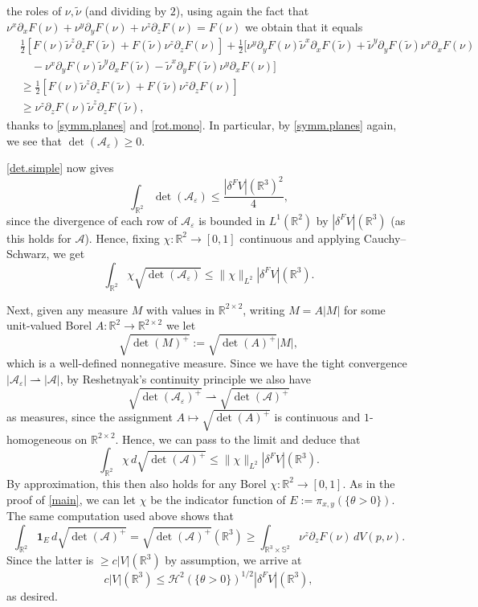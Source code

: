 \documentclass[11pt,a4paper]{amsart}
\newcommand{\R}{\mathbb{R}}
\newcommand{\de}{\partial}
\newcommand{\uno}{\bm{1}}
\theoremstyle{definition}
\renewcommand{\epsilon}{\varepsilon}
\newcommand{\weakto}{\rightharpoonup}
\begin{document}
the roles of $\nu,\tilde\nu$ (and dividing by $2$), using again the fact that $\nu^x\de_xF(\nu)+\nu^y\de_yF(\nu)+\nu^z\de_zF(\nu)=F(\nu)$ we obtain that it equals
\begin{align*}
&\frac12[F(\nu)\tilde\nu^z\de_zF(\tilde\nu)+F(\tilde\nu)\nu^z\de_zF(\nu)]+\frac12[\nu^y\de_yF(\nu)\tilde\nu^x\de_xF(\tilde\nu)+\tilde\nu^y\de_yF(\tilde\nu)\nu^x\de_xF(\nu)\\
&\quad-\nu^x\de_yF(\nu)\tilde\nu^y\de_xF(\tilde\nu)
-\tilde\nu^x\de_yF(\tilde\nu)\nu^y\de_xF(\nu)]\\
&\ge \frac12[F(\nu)\tilde\nu^z\de_zF(\tilde\nu)+F(\tilde\nu)\nu^z\de_zF(\nu)]\\
&\ge \nu^z\de_zF(\nu)\tilde\nu^z\de_zF(\tilde\nu),
\end{align*}
thanks to \cref{symm.planes} and \cref{rot.mono}.
In particular, by \cref{symm.planes} again, we see that
$\det(\mathcal{A}_\epsilon)\ge0$.

\cref{det.simple} now gives
$$\int_{\R^2}\det(\mathcal{A}_\epsilon)\le\frac{|\delta^FV|(\R^3)^2}{4},$$
since the divergence of each row of $\mathcal{A}_\epsilon$
is bounded in $L^1(\R^2)$ by $|\delta^FV|(\R^3)$
(as this holds for $\mathcal{A}$).
Hence, fixing $\chi:\R^2\to[0,1]$ continuous and applying Cauchy--Schwarz, we get
$$\int_{\R^2}\chi\sqrt{\det(\mathcal{A}_\epsilon)}
\le\|\chi\|_{L^2}|\delta^FV|(\R^3).$$

Next, given any measure $M$ with values in $\R^{2\times2}$,
writing $M=A|M|$ for some unit-valued Borel $A:\R^2\to\R^{2\times2}$ we let
$$\sqrt{\det(M)^+}:=\sqrt{\det(A)^+}|M|,$$
which is a well-defined nonnegative measure.
Since we have the tight convergence $|\mathcal{A}_\epsilon|\weakto|\mathcal{A}|$, by Reshetnyak's continuity principle we also have
$$\sqrt{\det(\mathcal{A}_\epsilon)^+}\weakto\sqrt{\det(\mathcal{A})^+}$$
as measures, since the assignment $A\mapsto\sqrt{\det(A)^+}$ is continuous and $1$-homogeneous on $\R^{2\times 2}$.
Hence, we can pass to the limit and deduce that
$$\int_{\R^2}\chi\,d\sqrt{\det(\mathcal{A})^+}
\le\|\chi\|_{L^2}|\delta^FV|(\R^3).$$
By approximation, this then also holds for any Borel $\chi:\R^2\to[0,1]$.
As in the proof of \cref{main}, we can let
$\chi$ be the indicator function of $E:=\pi_{x,y}(\{\theta>0\})$.
The same computation used above shows that
$$\int_{\R^2}\uno_E\,d\sqrt{\det(\mathcal{A})^+}
=\sqrt{\det(\mathcal{A})^+}(\R^3)
\ge\int_{\R^3\times\mathbb{S}^2}\nu^z\de_zF(\nu)\,dV(p,\nu).$$
Since the latter is $\ge c|V|(\R^3)$ by assumption,
we arrive at
$$c|V|(\R^3)\le\mathcal{H}^2(\{\theta>0\})^{1/2}|\delta^FV|(\R^3),$$
as desired.
\end{document}
